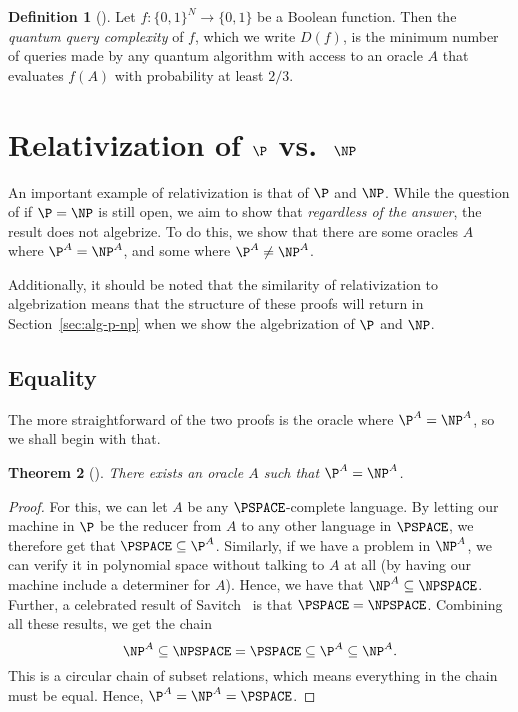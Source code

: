 \documentclass{reedthesis}
\theoremstyle{plain}
\newtheorem{thm}{Theorem}[section]
\theoremstyle{definition}
\newtheorem{defn}[thm]{Definition}
\theoremstyle{remark}
\numberwithin{equation}{section}
\begin{document}
\begin{defn}[{\cite[17]{AW09}}]\label{def:quant-qc}
  Let $f: \{0, 1\}^{N} \rightarrow \{0, 1\}$ be a Boolean function. Then the
  \emph{quantum query complexity} of $f$, which we write $D(f)$, is the
  minimum number of queries made by any quantum algorithm with access to an
  oracle $A$ that evaluates $f(A)$ with probability at least $2/3$.
\end{defn}

\section{Relativization of $\P$ vs.\ $\NP$}\label{sec:rel-p-np}

An important example of relativization is that of $\P$ and $\NP$. While the
question of if $\P = \NP$ is still open, we aim to show that \emph{regardless of
the answer}, the result does not algebrize. To do this, we show that there are
some oracles $A$ where $\P^{A} = \NP^{A}$, and some where $\P^{A} \ne \NP^{A}$.

Additionally, it should be noted that the similarity of relativization to
algebrization means that the structure of these proofs will return in
Section~\ref{sec:alg-p-np} when we show the algebrization of $\P$ and $\NP$.

\subsection{Equality}

The more straightforward of the two proofs is the oracle where
$\P^{A} = \NP^{A}$, so we shall begin with that.

\begin{thm}[{\cite[Theorem 2]{BGS75}}]\label{thm:p-np-rel}
  There exists an oracle $A$ such that $\P^{A} = \NP^{A}$.
\end{thm}

\begin{proof}
  For this, we can let $A$ be any $\PSPACE$-complete language. By letting our
  machine in $\P$ be the reducer from $A$ to any other language in $\PSPACE$, we
  therefore get that $\PSPACE \subseteq \P^{A}$. Similarly, if we have a problem in
  $\NP^{A}$, we can verify it in polynomial space without talking to $A$ at all
  (by having our machine include a determiner for $A$). Hence, we have that
  $\NP^{A} \subseteq \NPSPACE$. Further, a celebrated result of Savitch~\cite{Sav70} is
  that $\PSPACE = \NPSPACE$. Combining all these results, we get the chain
  \begin{equation}
    \NP^{A} \subseteq \NPSPACE = \PSPACE \subseteq \P^{A} \subseteq \NP^{A}.
  \end{equation}
  This is a circular chain of subset relations, which means everything in the
  chain must be equal. Hence, $\P^{A} = \NP^{A} = \PSPACE$.
\end{proof}
\end{document}
